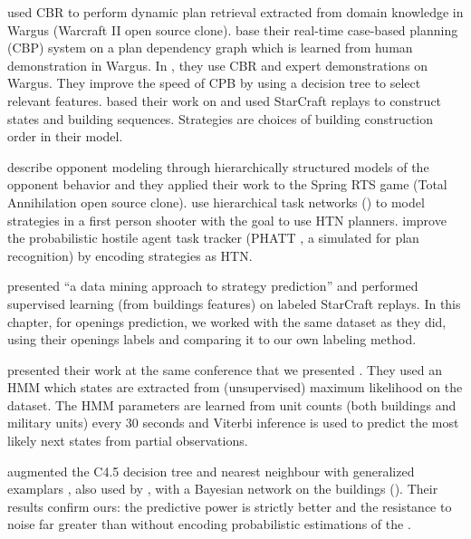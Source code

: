 \cite{LTW} used CBR to perform dynamic plan retrieval extracted from domain knowledge in Wargus (Warcraft II open source clone). \cite{CBR_Planning} base their real-time case-based planning (CBP) system on a plan dependency graph which is learned from human demonstration in Wargus. In \citep{OntanonCBR,PlanRetrieval}, they use CBR and expert demonstrations on Wargus. %
They improve the speed of CPB by using a decision tree to select relevant features. \cite{HsiehS08} based their work on \citep{LTW} and used StarCraft replays to construct states and building sequences. Strategies are choices of building construction order in their model. 

\cite{schadd2007opponent} describe opponent modeling through hierarchically structured models of the opponent behavior and they applied their work to the Spring RTS game (Total Annihilation open source clone). \cite{HTNPlanning} use hierarchical task networks () to model strategies in a first person shooter with the goal to use HTN planners. \cite{Kabanza2010} improve the probabilistic hostile agent task tracker (PHATT \citep{PHATT}, a simulated  for plan recognition) by encoding strategies as HTN. 

\cite{weberStrat} presented ``a data mining approach to strategy prediction'' and performed supervised learning (from buildings features) on labeled StarCraft replays. In this chapter, for openings prediction, we worked with the same dataset as they did, using their openings labels and comparing it to our own labeling method. %

\cite{HMMstrat_RTS_AIIDE11} presented their work at the same conference that we presented \citep{SYNNAEVE:StratPred}. They used an HMM which states are extracted from (unsupervised) maximum likelihood on the dataset. The HMM parameters are learned from unit counts (both buildings and military units) every 30 seconds and Viterbi inference is used to predict the most likely next states from partial observations. 

\cite{bjorn2012} augmented the C4.5 decision tree \citep{quinlan1993} and nearest neighbour with generalized examplars \citep{martin1995}, also used by \cite{weberStrat}, with a Bayesian network on the buildings (). Their results confirm ours: the predictive power is strictly better and the resistance to noise far greater than without encoding probabilistic estimations of the .



